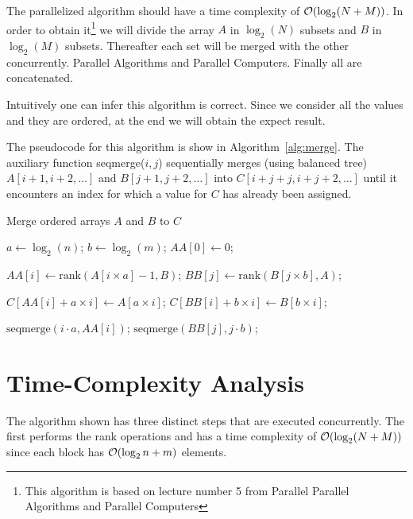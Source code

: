The parallelized algorithm should have a time complexity of $\mathcal{O}(\log_2(N + M))$. In order to obtain it\footnote{This algorithm is based on lecture number 5 from Parallel Parallel Algorithms and
Parallel Computers} we will divide the array $A$ in $\log_2(N)$ subsets and $B$ in $\log_2(M)$ subsets. Thereafter each set will be merged with the other concurrently. Parallel Algorithms and
Parallel Computers. Finally all are concatenated.

Intuitively one can infer this algorithm is correct. Since we consider all the values and they are ordered, at the end we will obtain the expect result.

The pseudocode for this algorithm is show in Algorithm~\ref{alg:merge}. The auxiliary function seqmerge($i,j$) sequentially merges (using balanced tree) $A[i+1,i+2,\dots]$ and $B [j+1,j+2,\dots]$ into $C[i+j+j, i+j+2,\dots]$ until it encounters an index for which a value for $C$ has already been assigned.


\begin{algorithm}[ht]
\caption{Merge ordered arrays $A$ and $B$ to $C$}
\label{alg:merge}
\begin{algorithmic}[1]
	\STATE $a \leftarrow \log_2(n)$; $b \leftarrow \log_2(m)$; $AA[0] \leftarrow 0$;

	\renewcommand{\algorithmicdo}{\textbf{pardo}}
		\STATE $AA[i] \leftarrow \text{rank}(A[i \times a] - 1, B)$;
		\STATE $BB[j] \leftarrow \text{rank}(B[j \times b], A )$;
	\ENDFOR

		\STATE $C[ AA[i] + a \times i ] \leftarrow A[ a \times i ]$;
		\STATE $C[ BB[i] + b \times i ] \leftarrow B[ b \times i ]$;
	\ENDFOR


		\STATE $\text{seqmerge}(i\cdot a , AA[i])$;
		\STATE $\text{seqmerge}(BB[j], j \cdot b)$;
	\ENDFOR
	
\end{algorithmic}
\end{algorithm}

\section{Time-Complexity Analysis}

The algorithm shown has three distinct steps that are executed concurrently.
The first performs the rank operations and has a time complexity of $\mathcal{O}(\log_2(N + M))$ since each block has $\mathcal{O}(\log_2{ n+m})$ elements.

